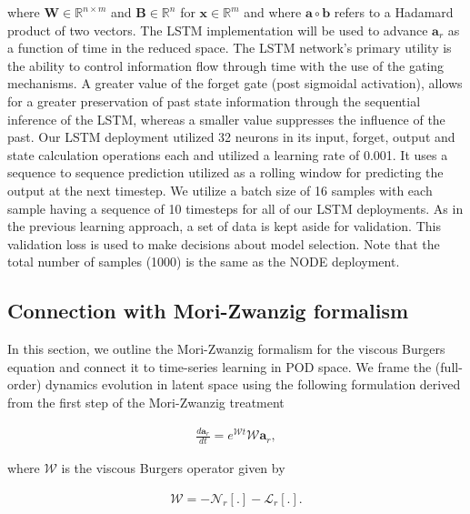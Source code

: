\documentclass[preprint,12pt]{elsarticle}
\begin{document}
where $\boldsymbol{W} \in \mathbb{R}^{n \times m}$ and $\boldsymbol{B} \in \mathbb{R}^{n}$ for $\mathbf{x} \in \mathbb{R}^m$ and where $\mathbf{a} \circ \mathbf{b}$ refers to a Hadamard product of two vectors. The LSTM implementation will be used to advance $\mathbf{a}_r$ as a function of time in the reduced space. The LSTM network's primary utility is the ability to control information flow through time with the use of the gating mechanisms. A greater value of the forget gate (post sigmoidal activation), allows for a greater preservation of past state information through the sequential inference of the LSTM, whereas a smaller value suppresses the influence of the past. Our LSTM deployment utilized 32 neurons in its input, forget, output and state calculation operations each and utilized a learning rate of 0.001. It uses a sequence to sequence prediction utilized as a rolling window for predicting the output at the next timestep. We utilize a batch size of 16 samples with each sample having a sequence of 10 timesteps for all of our LSTM deployments. As in the previous learning approach, a set of data is kept aside for validation. This validation loss is used to make decisions about model selection. Note that the total number of samples (1000) is the same as the NODE deployment.

\subsection{Connection with Mori-Zwanzig formalism}

In this section, we outline the Mori-Zwanzig formalism \cite{mori1965transport,zwanzig1973nonlinear} for the viscous Burgers equation and connect it to time-series learning in POD space. We frame the (full-order) dynamics evolution in latent space using the following formulation derived from the first step of the Mori-Zwanzig treatment
\begin{linenomath*}
\begin{align}
\frac{d \textbf{a}_r}{d t} = e^{\mathcal{W} t} \mathcal{W} \mathbf{a}_{r},
\end{align}
\end{linenomath*}
where $\mathcal{W}$ is the viscous Burgers operator given by
\begin{linenomath*}
\begin{align}
\mathcal{W} = -\mathcal{N}_{r}\left[. \right]-\mathcal{L}_{r}\left[ . \right].
\end{align}
\end{linenomath*}
\end{document}
